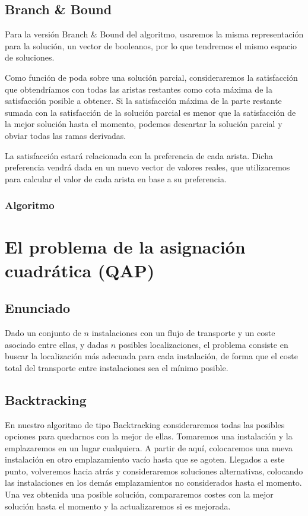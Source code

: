 \documentclass[a4paper, 11pt]{article} %
\begin{document}
        \subsection{Branch \& Bound}
	  Para la versión Branch \& Bound del algoritmo, usaremos la misma representación para la solución, 
	  un vector de booleanos, por lo que tendremos el mismo espacio de soluciones.
	  
	  Como función de poda sobre una solución parcial, consideraremos la satisfacción que obtendríamos con todas 
	  las aristas restantes como cota máxima de la satisfacción posible a obtener. Si la satisfacción máxima de 
	  la parte restante sumada con la satisfacción de la solución parcial es menor que la satisfacción de la mejor 
	  solución hasta el momento, podemos descartar la solución parcial y obviar todas las ramas derivadas. 
	  
	  La satisfacción estará relacionada con la preferencia de cada arista. Dicha preferencia vendrá dada en un 
	  nuevo vector de valores reales, que utilizaremos para calcular el valor de cada arista en base a su preferencia. 
        
        \subsubsection{Algoritmo}    
        \small
        \texttt{}
        \normalsize
        
        \section{El problema de la asignación cuadrática (QAP)}
	  \subsection{Enunciado}
	    Dado un conjunto de $n$ instalaciones con un flujo de transporte y un coste asociado entre ellas, y dadas $n$ posibles 
	    localizaciones, el problema consiste en buscar la localización más adecuada para cada instalación, de forma que el 
	    coste total del transporte entre instalaciones sea el mínimo posible. 
        
	  \subsection{Backtracking}
	    En nuestro algoritmo de tipo Backtracking consideraremos todas las posibles opciones para quedarnos con la mejor de ellas.
	    Tomaremos una instalación y la emplazaremos en un lugar cualquiera. A partir de aquí, colocaremos una nueva instalación
	    en otro emplazamiento vacío hasta que se agoten. Llegados a este punto, volveremos hacia atrás y consideraremos soluciones
	    alternativas, colocando las instalaciones en los demás emplazamientos no considerados hasta el momento. Una vez obtenida una
	    posible solución, compararemos costes con la mejor solución hasta el momento y la actualizaremos si es mejorada.       
	    
\end{document}
